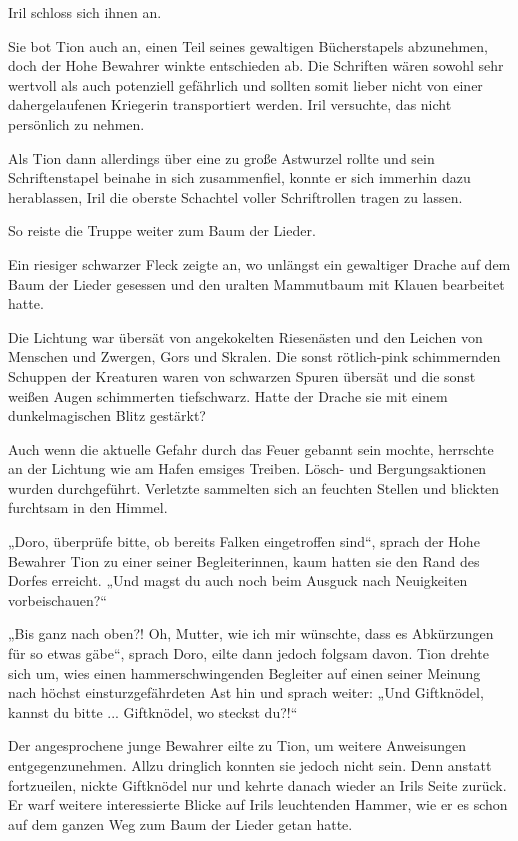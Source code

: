 Iril schloss sich ihnen an.

Sie bot Tion auch an, einen Teil seines gewaltigen Bücherstapels abzunehmen, doch der Hohe Bewahrer winkte entschieden ab. Die Schriften wären sowohl sehr wertvoll als auch potenziell gefährlich und sollten somit lieber nicht von einer dahergelaufenen Kriegerin transportiert werden. Iril versuchte, das nicht persönlich zu nehmen.

Als Tion dann allerdings über eine zu große Astwurzel rollte und sein Schriftenstapel beinahe in sich zusammenfiel, konnte er sich immerhin dazu herablassen, Iril die oberste Schachtel voller Schriftrollen tragen zu lassen.

So reiste die Truppe weiter zum Baum der Lieder.\bigskip







Ein riesiger schwarzer Fleck zeigte an, wo unlängst ein gewaltiger Drache auf dem Baum der Lieder gesessen und den uralten Mammutbaum mit Klauen bearbeitet hatte.

Die Lichtung war übersät von angekokelten Riesenästen und den Leichen von Menschen und Zwergen, Gors und Skralen. Die sonst rötlich-pink schimmernden Schuppen der Kreaturen waren von schwarzen Spuren übersät und die sonst weißen Augen schimmerten tiefschwarz. Hatte der Drache sie mit einem dunkelmagischen Blitz gestärkt?

Auch wenn die aktuelle Gefahr durch das Feuer gebannt sein mochte, herrschte an der Lichtung wie am Hafen emsiges Treiben. Lösch- und Bergungsaktionen wurden durchgeführt. Verletzte sammelten sich an feuchten Stellen und blickten furchtsam in den Himmel.

„Doro, überprüfe bitte, ob bereits Falken eingetroffen sind“, sprach der Hohe Bewahrer Tion zu einer seiner Begleiterinnen, kaum hatten sie den Rand des Dorfes erreicht. „Und magst du auch noch beim Ausguck nach Neuigkeiten vorbeischauen?“

„Bis ganz nach oben?! Oh, Mutter, wie ich mir wünschte, dass es Abkürzungen für so etwas gäbe“, sprach Doro, eilte dann jedoch folgsam davon. Tion drehte sich um, wies einen hammerschwingenden Begleiter auf einen seiner Meinung nach höchst einsturzgefährdeten Ast hin und sprach weiter: „Und Giftknödel, kannst du bitte ... Giftknödel, wo steckst du?!“

Der angesprochene junge Bewahrer eilte zu Tion, um weitere Anweisungen entgegenzunehmen. Allzu dringlich konnten sie jedoch nicht sein. Denn anstatt fortzueilen, nickte Giftknödel nur und kehrte danach wieder an Irils Seite zurück. Er warf weitere interessierte Blicke auf Irils leuchtenden Hammer, wie er es schon auf dem ganzen Weg zum Baum der Lieder getan hatte.

